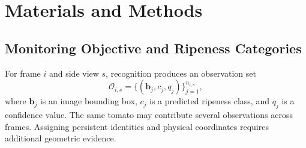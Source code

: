 \documentclass[agriengineering,article,submit,pdftex,moreauthors]{Definitions/mdpi}
\begin{document}
\section{Materials and Methods}
\subsection{Monitoring Objective and Ripeness Categories}
For frame $i$ and side view $s$, recognition produces an observation set
\begin{equation}
\mathcal{O}_{i,s}=\{(\mathbf{b}_j,c_j,q_j)\}_{j=1}^{n_{i,s}},
\end{equation}
where $\mathbf{b}_j$ is an image bounding box, $c_j$ is a predicted ripeness class, and $q_j$ is a confidence value. The same tomato may contribute several observations across frames. Assigning persistent identities and physical coordinates requires additional geometric evidence.
\end{document}
